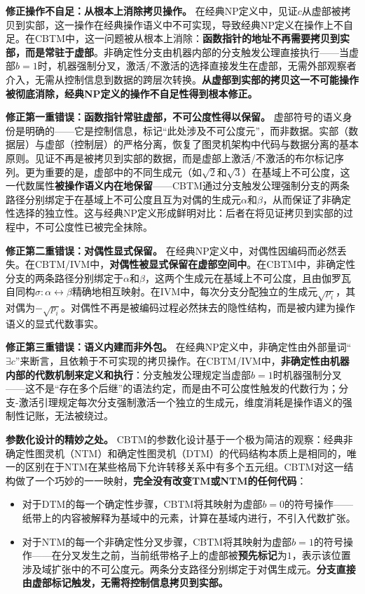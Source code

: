 \documentclass{ctexart}
\begin{document}
	\textbf{修正操作不自足：从根本上消除拷贝操作。} 在经典NP定义中，见证$c$从虚部被拷贝到实部，这一操作在经典操作语义中不可实现，导致经典NP定义在操作上不自足。在CBTM中，这一问题被从根本上消除：\textbf{函数指针的地址不再需要拷贝到实部，而是常驻于虚部}。非确定性分支由机器内部的分支触发公理直接执行——当虚部$b=1$时，机器强制分叉，激活/不激活的选择直接发生在虚部，无需外部观察者介入，无需从控制信息到数据的跨层次转换。\textbf{从虚部到实部的拷贝这一不可能操作被彻底消除，经典NP定义的操作不自足性得到根本修正。}
	
	\textbf{修正第一重错误：函数指针常驻虚部，不可公度性得以保留。} 虚部符号的语义身份是明确的——它是控制信息，标记``此处涉及不可公度元''，而非数据。实部（数据层）与虚部（控制层）的严格分离，恢复了图灵机架构中代码与数据分离的基本原则。见证不再是被拷贝到实部的数据，而是虚部上激活/不激活的布尔标记序列。更为重要的是，虚部中的不同生成元（如$\sqrt{2}$和$\sqrt{3}$）在基域上不可公度，这一代数属性\textbf{被操作语义内在地保留}——CBTM通过分支触发公理强制分支的两条路径分别绑定于在基域上不可公度且互为对偶的生成元$\alpha$和$\beta$，从而保证了非确定性选择的独立性。这与经典NP定义形成鲜明对比：后者在将见证拷贝到实部的过程中，不可公度性已被完全抹除。
	
	\textbf{修正第二重错误：对偶性显式保留。} 在经典NP定义中，对偶性因编码而必然丢失。在CBTM/IVM中，\textbf{对偶性被显式保留在虚部空间中}。在CBTM中，非确定性分支的两条路径分别绑定于$\alpha$和$\beta$，这两个生成元在基域上不可公度，且由伽罗瓦自同构$\sigma: \alpha \leftrightarrow \beta$精确地相互映射。在IVM中，每次分支分配独立的生成元$\sqrt{p_i}$，其对偶为$-\sqrt{p_i}$。对偶性不再是被编码过程必然抹去的隐性结构，而是被内建为操作语义的显式代数事实。
	
	\textbf{修正第三重错误：语义内建而非外包。} 在经典NP定义中，非确定性由外部量词``$\exists c$''来断言，且依赖于不可实现的拷贝操作。在CBTM/IVM中，\textbf{非确定性由机器内部的代数机制来定义和执行}：分支触发公理规定当虚部$b=1$时机器强制分叉——这不是``存在多个后继''的语法约定，而是由不可公度性触发的代数行为；分支-激活引理规定每次分支强制激活一个独立的生成元，维度消耗是操作语义的强制性记账，无法被绕过。
	
	\textbf{参数化设计的精妙之处。} CBTM的参数化设计基于一个极为简洁的观察：经典非确定性图灵机（NTM）和确定性图灵机（DTM）的代码结构本质上是相同的，唯一的区别在于NTM在某些格局下允许转移关系中有多个五元组。CBTM对这一结构做了一个巧妙的一一映射，\textbf{完全没有改变TM或NTM的任何代码}：
	
	\begin{itemize}
		\item 对于DTM的每一个确定性步骤，CBTM将其映射为虚部$b=0$的符号操作——纸带上的内容被解释为基域中的元素，计算在基域内进行，不引入代数扩张。
		\item 对于NTM的每一个非确定性分叉步骤，CBTM将其映射为虚部$b=1$的符号操作——在分叉发生之前，当前纸带格子上的虚部被\textbf{预先标记}为$1$，表示该位置涉及域扩张中的不可公度元。两条分支路径分别绑定于对偶生成元。\textbf{分支直接由虚部标记触发，无需将控制信息拷贝到实部。}
	\end{itemize}
	
\end{document}
